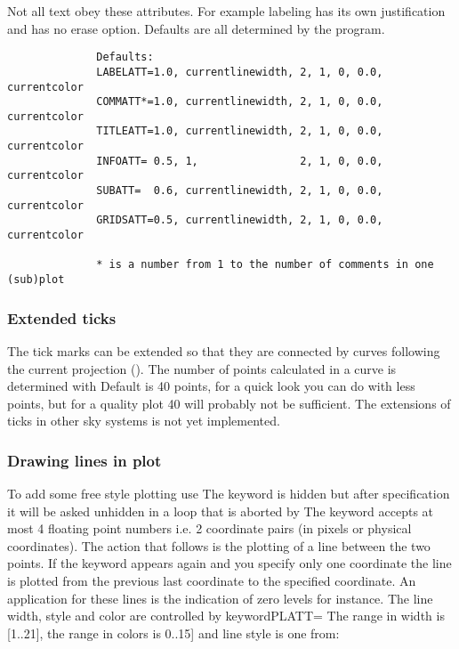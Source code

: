 Not all text obey these attributes. For example labeling
has its own justification and has no erase option.
Defaults are all determined by the program.
              
\begin{verbatim}
              Defaults:
              LABELATT=1.0, currentlinewidth, 2, 1, 0, 0.0, currentcolor
              COMMATT*=1.0, currentlinewidth, 2, 1, 0, 0.0, currentcolor
              TITLEATT=1.0, currentlinewidth, 2, 1, 0, 0.0, currentcolor
              INFOATT= 0.5, 1,                2, 1, 0, 0.0, currentcolor
              SUBATT=  0.6, currentlinewidth, 2, 1, 0, 0.0, currentcolor
              GRIDSATT=0.5, currentlinewidth, 2, 1, 0, 0.0, currentcolor

              * is a number from 1 to the number of comments in one (sub)plot
\end{verbatim}
 
\subsubsection*{Extended ticks}
              
The tick marks can be extended so that they are connected
by curves following the current projection ().
The number of points calculated in a curve is determined
with  Default is 40 points, for a quick look 
you can do with less points, but for a quality plot 40
will probably not be sufficient. The extensions of ticks
in other sky systems is not yet implemented.
              

\subsubsection*{Drawing lines in plot}          
              
To add some free style plotting use  The keyword is
hidden but after specification it will be asked unhidden
in a loop that is aborted by  The keyword
accepts at most 4 floating point numbers i.e. 2 coordinate 
pairs (in pixels or physical coordinates). The action that
follows is the plotting of a line between the two points.
If the keyword appears again and you specify only one
coordinate the line is plotted from the previous last
coordinate to the specified coordinate. An application for
these lines is the indication of zero levels for instance.
The line width, style and color are controlled by 
keyword{PLATT=}
The range in width is [1..21], the range in colors is
0..15] and line style is one from:
              
